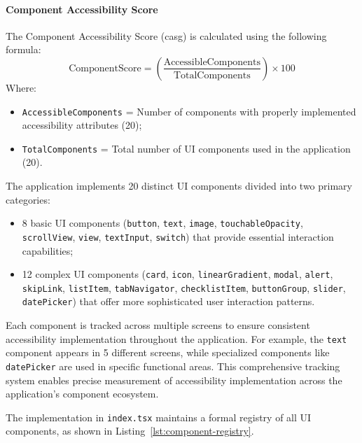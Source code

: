 \paragraph{Component Accessibility Score}

The Component Accessibility Score (\gls{casg}) is calculated using the following formula:
\begin{equation}
\text{ComponentScore}
= \left(\frac{\text{AccessibleComponents}}{\text{TotalComponents}}\right) \times 100
\end{equation}
Where:
\begin{itemize}
    \item \texttt{AccessibleComponents} = Number of components with properly implemented accessibility attributes (20);
    \item \texttt{TotalComponents} = Total number of UI components used in the application (20).
\end{itemize}

The application implements 20 distinct UI components divided into two primary categories:
\begin{itemize}

\item 8 basic UI components (\texttt{button}, \texttt{text}, \texttt{image}, \texttt{touchableOpacity}, \texttt{scrollView}, \texttt{view}, \texttt{textInput}, \texttt{switch}) that provide essential interaction capabilities;

\item 12 complex UI components (\texttt{card}, \texttt{icon}, \texttt{linearGradient}, \texttt{modal}, \texttt{alert}, \texttt{skipLink}, \texttt{listItem}, \texttt{tabNavigator}, \texttt{checklistItem}, \texttt{buttonGroup}, \texttt{slider}, \texttt{datePicker}) that offer more sophisticated user interaction patterns.

\end{itemize}
Each component is tracked across multiple screens to ensure consistent accessibility implementation throughout the application. For example, the \texttt{text} component appears in 5 different screens, while specialized components like \texttt{datePicker} are used in specific functional areas. This comprehensive tracking system enables precise measurement of accessibility implementation across the application's component ecosystem.

The implementation in \texttt{index.tsx} maintains a formal registry of all UI components, as shown in Listing~\ref{lst:component-registry}.

